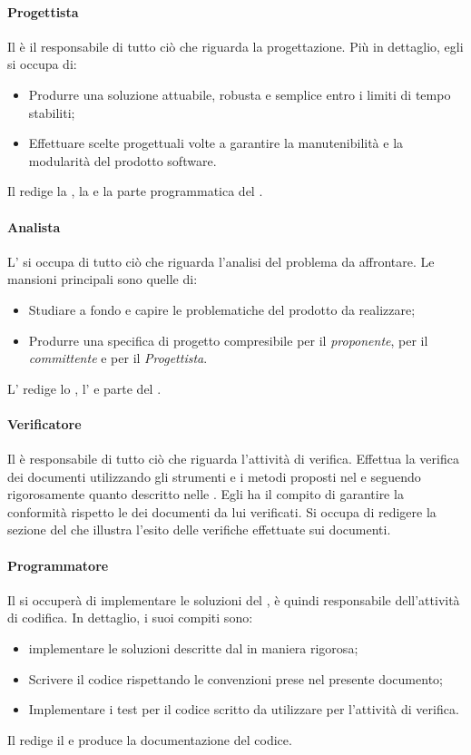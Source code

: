 \paragraph{Progettista}
Il \textit{\Prog} è il responsabile di tutto ciò che riguarda la progettazione.
Più in dettaglio, egli si occupa di:
\begin{itemize}
  \item Produrre una soluzione attuabile, robusta e semplice entro i limiti di
  tempo stabiliti;
  \item Effettuare scelte progettuali volte a garantire la manutenibilità e la
  modularità del prodotto software.
\end{itemize}
Il \textit{\Prog} redige la \textit{\ST}, la \textit{\DDP} e la parte
programmatica del \textit{\PdQ}.

\paragraph{Analista}
L'\textit{\Ana} si occupa di tutto ciò che riguarda l'analisi del problema da
affrontare. Le mansioni principali sono quelle di:
\begin{itemize}
  \item Studiare a fondo e capire le problematiche del prodotto da realizzare;
  \item Produrre una specifica di progetto compresibile per il
  \textit{proponente}, per il \textit{committente} e per il
  \textit{Progettista}.
\end{itemize}
L'\textit{\Ana} redige lo \textit{\SdF}, l'\textit{\AdR} e parte del
\textit{\PdQ}.

\paragraph{Verificatore}
Il \textit{\Ver} è responsabile di tutto ciò che riguarda l'attività di verifica.
Effettua la verifica dei documenti utilizzando gli strumenti e i metodi proposti nel
\textit{\PdQ} e seguendo rigorosamente quanto descritto nelle \textit{\NdP}.
Egli ha il compito di garantire la conformità rispetto le \textit{\NdP} dei documenti da lui verificati.
Si occupa di redigere la sezione del \textit{\PdQ} che illustra l'esito delle
verifiche effettuate sui documenti.

\paragraph{Programmatore}
Il \textit{\Progr} si occuperà di implementare le soluzioni del \textit{\Prog}, è quindi
responsabile dell'attività di codifica. In dettaglio, i suoi compiti sono:
\begin{itemize}
  \item implementare le soluzioni descritte dal \textit{\Prog} in maniera
  rigorosa;
  \item Scrivere il codice rispettando le convenzioni prese nel presente
  documento;
  \item Implementare i test per il codice scritto da utilizzare per l'attività
  di verifica.
\end{itemize}
Il \textit{\Progr} redige il \textit{\MU} e produce la documentazione del codice.

